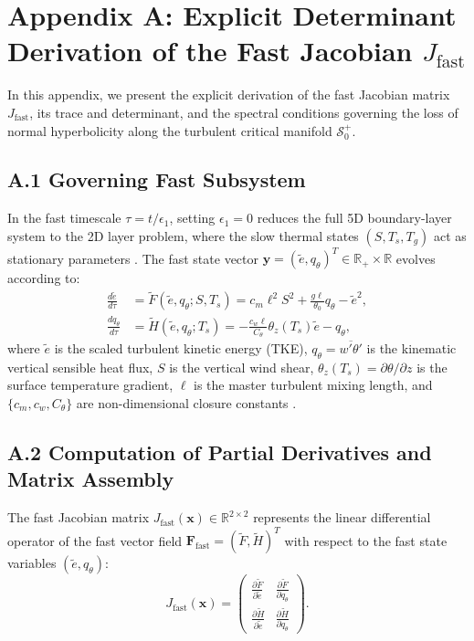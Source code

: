 \section*{Appendix A: Explicit Determinant Derivation of the Fast Jacobian $J_{\mathrm{fast}}$}
\label{app:fast_jacobian}

In this appendix, we present the explicit derivation of the fast Jacobian matrix $J_{\mathrm{fast}}$, its trace and determinant, and the spectral conditions governing the loss of normal hyperbolicity along the turbulent critical manifold $\mathcal{S}_0^+$.

\subsection*{A.1 Governing Fast Subsystem}

In the fast timescale $\tau = t / \epsilon_1$, setting $\epsilon_1 = 0$ reduces the full 5D boundary-layer system to the 2D layer problem, where the slow thermal states $(S, T_s, T_g)$ act as stationary parameters \citep{Fenichel1979, Kuehn2015}. The fast state vector $\mathbf{y} = (\tilde e, q_\theta)^T \in \mathbb{R}_+ \times \mathbb{R}$ evolves according to:
\begin{align}
\frac{d\tilde e}{d\tau} &= \tilde{F}(\tilde e, q_\theta; S, T_s) = c_m \ell^2 S^2 + \frac{g \ell}{\theta_0} q_\theta - \tilde e^2, \label{eq:fast_e_app} \\[4pt]
\frac{d q_\theta}{d\tau} &= \tilde{H}(\tilde e, q_\theta; T_s) = -\frac{c_w \ell}{C_\theta} \theta_z(T_s) \tilde e - q_\theta, \label{eq:fast_q_app}
\end{align}
where $\tilde e$ is the scaled turbulent kinetic energy (TKE), $q_\theta = \overline{w'\theta'}$ is the kinematic vertical sensible heat flux, $S$ is the vertical wind shear, $\theta_z(T_s) = \partial \theta / \partial z$ is the surface temperature gradient, $\ell$ is the master turbulent mixing length, and $\{c_m, c_w, C_\theta\}$ are non-dimensional closure constants \citep{Stull1988, Garratt1992}.

\subsection*{A.2 Computation of Partial Derivatives and Matrix Assembly}

The fast Jacobian matrix $J_{\mathrm{fast}}(\mathbf{x}) \in \mathbb{R}^{2 \times 2}$ represents the linear differential operator of the fast vector field $\mathbf{F}_{\mathrm{fast}} = (\tilde{F}, \tilde{H})^T$ with respect to the fast state variables $(\tilde e, q_\theta)$:
\begin{equation}
J_{\mathrm{fast}}(\mathbf{x}) = 
\begin{pmatrix}
\frac{\partial \tilde{F}}{\partial \tilde e} & \frac{\partial \tilde{F}}{\partial q_\theta} \\[8pt]
\frac{\partial \tilde{H}}{\partial \tilde e} & \frac{\partial \tilde{H}}{\partial q_\theta}
\end{pmatrix}.
\label{eq:j_fast_def}
\end{equation}

